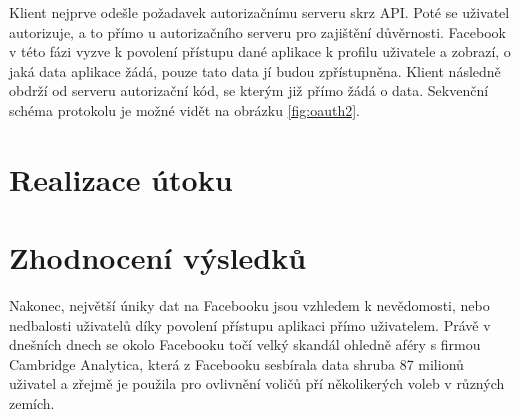 \documentclass[10pt,a4paper,titlepage]{article}
\begin{document}
  Klient nejprve odešle požadavek autorizačnímu serveru skrz API. Poté
  se uživatel autorizuje, a to přímo u autorizačního serveru pro
  zajištění důvěrnosti. Facebook v této fázi vyzve k povolení přístupu
  dané aplikace k profilu uživatele a zobrazí, o jaká data aplikace žádá,
  pouze tato data jí budou zpřístupněna. Klient následně obdrží od serveru
  autorizační kód, se kterým již přímo žádá o data. Sekvenční schéma protokolu
  je možné vidět na obrázku \ref{fig:oauth2}.
  
  \section*{Realizace útoku}

  \section*{Zhodnocení výsledků}
  Nakonec, největší úniky dat na Facebooku jsou vzhledem k nevědomosti,
  nebo nedbalosti uživatelů díky povolení přístupu aplikaci přímo uživatelem.
  Právě v dnešních dnech se okolo Facebooku točí velký skandál ohledně aféry
  s firmou Cambridge Analytica, která z Facebooku sesbírala data shruba
  87 milionů uživatel a zřejmě je použila pro ovlivnění voličů pří
  několikerých voleb v různých zemích. \cite{CambridgeAnalyticaScandal}


  
  
  \printbibliography
\end{document}
